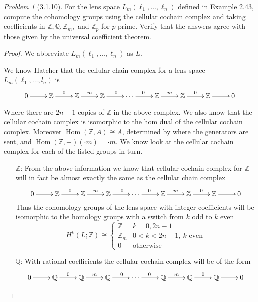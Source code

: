 \documentclass[10pt]{article}
\newcommand{\bb}[1]{\mathbb{#1}}
\DeclareMathOperator{\Hom}{Hom}
\theoremstyle{remark}
\newtheorem{problem}{Problem}
\begin{document}
\begin{problem}[3.1.10]
  For the lens space $L_m(\ell_1,\ldots,\ell_n)$ defined in Example 2.43,
  compute the cohomology groups using the cellular cochain complex
  and taking coefficients in $\bb{Z},\bb{Q},\bb{Z}_m,$ and $\bb{Z}_p$
  for $p$ prime. Verify that the answers agree with those given by the
  universal coefficient theorem.
\end{problem}

\begin{proof}
  We abbreviate $L_m(\ell_1,\ldots,\ell_n)$ as $L$.

  We know Hatcher that the cellular chain complex for a lens space
  $L_m(\ell_1,\ldots,l_n)$ is
  \[
    \xymatrix{
      0 \ar[r] & \bb{Z} \ar[r]^0 & \bb{Z} \ar[r]^m & \bb{Z} \ar[r]^0 & \cdots \ar[r]^0 & \bb{Z} \ar[r]^m & \bb{Z} \ar[r]^0 & \bb{Z} \ar[r] & 0
    }
  \]

  Where there are $2n-1$ copies of $\bb{Z}$ in the above complex.
  We also know that the cellular cochain complex is isomorphic to the hom dual
  of the cellular cochain complex. Moreover $\Hom(\bb{Z},A)\cong A$, determined by
  where the generators are sent, and $\Hom(\bb{Z},-)(\cdot m)=\cdot m$. We know look
  at the cellular cochain complex for each of the listed groups in turn.

  \begin{itemize}
  \item[$\bb{Z}$:] From the above information we know that cellular cochain
    complex for $\bb{Z}$ will in fact be almost exactly the same as the cellular chain complex
    \[
      \xymatrix{
        0 \ar[r] & \bb{Z} \ar[r]^0 & \bb{Z} \ar[r]^m & \bb{Z} \ar[r]^0 & \cdots \ar[r]^0 & \bb{Z} \ar[r]^m & \bb{Z} \ar[r]^0 & \bb{Z} \ar[r] & 0
      }
    \]
    Thus the cohomology groups of the lens space with integer coefficients
    will be isomorphic to the homology groups with a switch from $k$ odd to $k$ even
    \[
      H^k(L;\bb{Z}) \cong  
      \left\{
        \begin{array}{ll}
          \bb{Z}& k=0,2n-1\\
          \bb{Z}_m& 0<k<2n-1,\ \text{$k$ even}\\
          0 & \text{otherwise}
        \end{array}
      \right.
    \]
  \item[$\bb{Q}$:] With rational coefficients the cellular cochain complex will
    be of the form
    \[
      \xymatrix{
        0 \ar[r] & \bb{Q} \ar[r]^0 & \bb{Q} \ar[r]^m & \bb{Q} \ar[r]^0 & \cdots \ar[r]^0 & \bb{Q} \ar[r]^m & \bb{Q} \ar[r]^0 & \bb{Q} \ar[r] & 0
      }
    \]


\end{itemize}
\end{proof}
\end{document}
